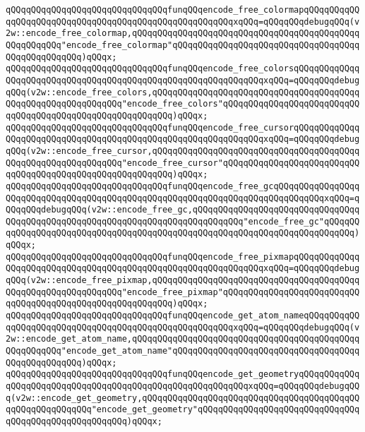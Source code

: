 \verb|qQQqqQQqqQQqqQQqqQQqqQQqqQQqqQQqfunqQQqencode_free_colormapqQQqqQQqqQQqqQQqqQQqqQQqqQQqqQQqqQQqqQQqqQQqqQQqqQQqqQQqxqQQq=qQQqqQQqdebugqQQq(v2w::encode_free_colormap,qQQqqQQqqQQqqQQqqQQqqQQqqQQqqQQqqQQqqQQqqQQqqQQqqQQqqQQq"encode_free_colormap"qQQqqQQqqQQqqQQqqQQqqQQqqQQqqQQqqQQqqQQqqQQqqQQqqQQq)qQQqx;|\newline
\verb|qQQqqQQqqQQqqQQqqQQqqQQqqQQqqQQqfunqQQqencode_free_colorsqQQqqQQqqQQqqQQqqQQqqQQqqQQqqQQqqQQqqQQqqQQqqQQqqQQqqQQqqQQqqQQqxqQQq=qQQqqQQqdebugqQQq(v2w::encode_free_colors,qQQqqQQqqQQqqQQqqQQqqQQqqQQqqQQqqQQqqQQqqQQqqQQqqQQqqQQqqQQqqQQq"encode_free_colors"qQQqqQQqqQQqqQQqqQQqqQQqqQQqqQQqqQQqqQQqqQQqqQQqqQQqqQQqqQQq)qQQqx;|\newline
\verb|qQQqqQQqqQQqqQQqqQQqqQQqqQQqqQQqfunqQQqencode_free_cursorqQQqqQQqqQQqqQQqqQQqqQQqqQQqqQQqqQQqqQQqqQQqqQQqqQQqqQQqqQQqqQQqxqQQq=qQQqqQQqdebugqQQq(v2w::encode_free_cursor,qQQqqQQqqQQqqQQqqQQqqQQqqQQqqQQqqQQqqQQqqQQqqQQqqQQqqQQqqQQqqQQq"encode_free_cursor"qQQqqQQqqQQqqQQqqQQqqQQqqQQqqQQqqQQqqQQqqQQqqQQqqQQqqQQqqQQq)qQQqx;|\newline
\verb|qQQqqQQqqQQqqQQqqQQqqQQqqQQqqQQqfunqQQqencode_free_gcqQQqqQQqqQQqqQQqqQQqqQQqqQQqqQQqqQQqqQQqqQQqqQQqqQQqqQQqqQQqqQQqqQQqqQQqqQQqqQQqxqQQq=qQQqqQQqdebugqQQq(v2w::encode_free_gc,qQQqqQQqqQQqqQQqqQQqqQQqqQQqqQQqqQQqqQQqqQQqqQQqqQQqqQQqqQQqqQQqqQQqqQQqqQQqqQQq"encode_free_gc"qQQqqQQqqQQqqQQqqQQqqQQqqQQqqQQqqQQqqQQqqQQqqQQqqQQqqQQqqQQqqQQqqQQqqQQqqQQq)qQQqx;|\newline
\verb|qQQqqQQqqQQqqQQqqQQqqQQqqQQqqQQqfunqQQqencode_free_pixmapqQQqqQQqqQQqqQQqqQQqqQQqqQQqqQQqqQQqqQQqqQQqqQQqqQQqqQQqqQQqqQQqxqQQq=qQQqqQQqdebugqQQq(v2w::encode_free_pixmap,qQQqqQQqqQQqqQQqqQQqqQQqqQQqqQQqqQQqqQQqqQQqqQQqqQQqqQQqqQQqqQQq"encode_free_pixmap"qQQqqQQqqQQqqQQqqQQqqQQqqQQqqQQqqQQqqQQqqQQqqQQqqQQqqQQqqQQq)qQQqx;|\newline
\verb|qQQqqQQqqQQqqQQqqQQqqQQqqQQqqQQqfunqQQqencode_get_atom_nameqQQqqQQqqQQqqQQqqQQqqQQqqQQqqQQqqQQqqQQqqQQqqQQqqQQqqQQqxqQQq=qQQqqQQqdebugqQQq(v2w::encode_get_atom_name,qQQqqQQqqQQqqQQqqQQqqQQqqQQqqQQqqQQqqQQqqQQqqQQqqQQqqQQq"encode_get_atom_name"qQQqqQQqqQQqqQQqqQQqqQQqqQQqqQQqqQQqqQQqqQQqqQQqqQQq)qQQqx;|\newline
\verb|qQQqqQQqqQQqqQQqqQQqqQQqqQQqqQQqfunqQQqencode_get_geometryqQQqqQQqqQQqqQQqqQQqqQQqqQQqqQQqqQQqqQQqqQQqqQQqqQQqqQQqqQQqxqQQq=qQQqqQQqdebugqQQq(v2w::encode_get_geometry,qQQqqQQqqQQqqQQqqQQqqQQqqQQqqQQqqQQqqQQqqQQqqQQqqQQqqQQqqQQq"encode_get_geometry"qQQqqQQqqQQqqQQqqQQqqQQqqQQqqQQqqQQqqQQqqQQqqQQqqQQqqQQq)qQQqx;|\newline
